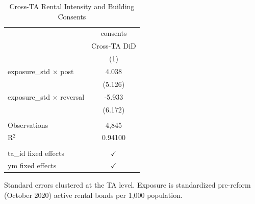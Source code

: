 
\begin{table}[htbp]
   \caption{\label{tab:cross_ta} Cross-TA Rental Intensity and Building Consents}
   \bigskip
   \centering
   \begin{tabular}{lc}
      \toprule
                                        & consents\\  
                                        & Cross-TA DiD \\   
                                        & (1)\\  
      \midrule 
      exposure\_std $\times$ post       & 4.038\\   
                                        & (5.126)\\   
      exposure\_std $\times$ reversal   & -5.933\\   
                                        & (6.172)\\   
       \\
      Observations                      & 4,845\\  
      R$^2$                             & 0.94100\\  
       \\
      ta\_id fixed effects              & $\checkmark$\\   
      ym fixed effects                  & $\checkmark$\\   
      \bottomrule
   \end{tabular}
   
   \par \raggedright \footnotesize 
   Standard errors clustered at the TA level. Exposure is standardized pre-reform (October 2020) active rental bonds per 1,000 population.
\end{table}


